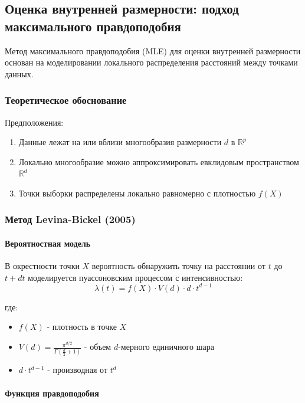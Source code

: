 \documentclass[a4paper,12pt]{article}
\begin{document}
\subsection{Оценка внутренней размерности: подход максимального правдоподобия}

Метод максимального правдоподобия (MLE) для оценки внутренней размерности основан на моделировании локального распределения расстояний между точками данных.

\subsubsection{Теоретическое обоснование}

Предположения:
\begin{enumerate}
    \item Данные лежат на или вблизи многообразия размерности $d$ в $\mathbb{R}^p$
    \item Локально многообразие можно аппроксимировать евклидовым пространством $\mathbb{R}^d$
    \item Точки выборки распределены локально равномерно с плотностью $f(X)$
\end{enumerate}

\subsubsection{Метод Levina-Bickel (2005)}

\paragraph{Вероятностная модель}

В окрестности точки $X$ вероятность обнаружить точку на расстоянии от $t$ до $t + dt$ моделируется пуассоновским процессом с интенсивностью:
\begin{equation}
    \lambda(t) = f(X) \cdot V(d) \cdot d \cdot t^{d-1}
\end{equation}

где:
\begin{itemize}
    \item $f(X)$ - плотность в точке $X$
    \item $V(d) = \frac{\pi^{d/2}}{\Gamma(\frac{d}{2}+1)}$ - объем $d$-мерного единичного шара
    \item $d \cdot t^{d-1}$ - производная от $t^d$
\end{itemize}

\paragraph{Функция правдоподобия}
\end{document}
